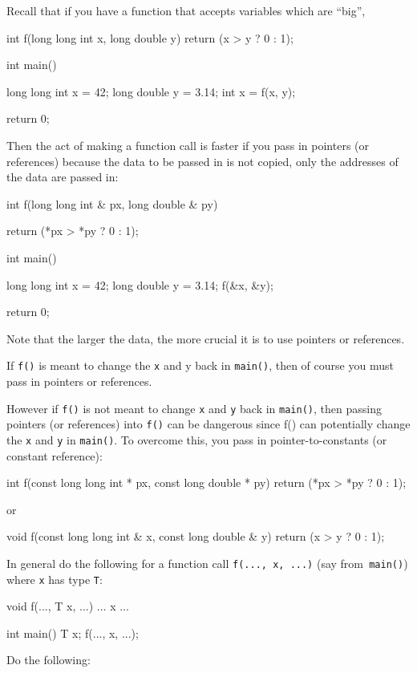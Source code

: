 Recall that if you have a function that accepts variables which are ``big'',

\begin{consolethree}[escapeinside=||]
int f(long long int x, long double y)
{
    return (x > y ? 0 : 1);
}

int main()
{
    long long int x = 42;
    long double y = 3.14;
    int x = f(x, y);

    return 0;
}
\end{consolethree}
Then the act of making a function call is faster if you pass in pointers (or references) because the data to be passed in is not copied, only the addresses of the data are passed in:

\begin{consolethree}[escapeinside=||]
int f(long long int & px, long double & py)
{
    return (*px > *py ? 0 : 1);

}

int main()
{
    long long int x = 42;
    long double y = 3.14;
    f(&x, &y);

    return 0;
}
\end{consolethree}
Note that the larger the data, the more crucial it is to use pointers or references.

If \texttt{f()} is meant to change the \texttt{x} and y back in \texttt{main()}, then of course you must pass in pointers or references.

However if \texttt{f()} is not meant to change \texttt{x} and \texttt{y} back in \texttt{main()}, then passing pointers (or references) into \texttt{f()} can be dangerous since f() can potentially change the \texttt{x} and \texttt{y} in \texttt{main()}. To overcome this, you pass in pointer-to-constants (or constant reference):

\begin{consolethree}[escapeinside=||]
int f(const long long int * px,
      const long double * py)
{
    return (*px > *py ? 0 : 1);
}
\end{consolethree}
or

\begin{consolethree}[escapeinside=||]
void f(const long long int & x,
       const long double & y)
{
    return (x > y ? 0 : 1);
}
\end{consolethree}

In general do the following for a function call \texttt{f(..., x, ...)} (say from\texttt{ main()}) where \texttt{x} has type \texttt{T}:

\begin{consolethree}[escapeinside=||]
void f(..., T x, ...)
{
    ... x ...
}

int main()
{
    T x;
    f(..., x, ...);
}
\end{consolethree}
Do the following:

